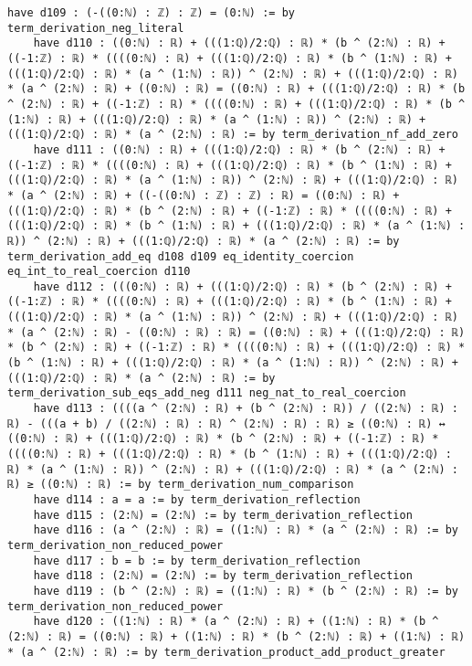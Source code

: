 \documentclass{article}
\begin{document}
\begin{tcolorbox}[colback=white!10, width=\linewidth]
\begin{lstlisting}[language=Lean4]
    have d109 : (-((0:ℕ) : ℤ) : ℤ) = (0:ℕ) := by term_derivation_neg_literal
    have d110 : ((0:ℕ) : ℝ) + (((1:ℚ)/2:ℚ) : ℝ) * (b ^ (2:ℕ) : ℝ) + ((-1:ℤ) : ℝ) * ((((0:ℕ) : ℝ) + (((1:ℚ)/2:ℚ) : ℝ) * (b ^ (1:ℕ) : ℝ) + (((1:ℚ)/2:ℚ) : ℝ) * (a ^ (1:ℕ) : ℝ)) ^ (2:ℕ) : ℝ) + (((1:ℚ)/2:ℚ) : ℝ) * (a ^ (2:ℕ) : ℝ) + ((0:ℕ) : ℝ) = ((0:ℕ) : ℝ) + (((1:ℚ)/2:ℚ) : ℝ) * (b ^ (2:ℕ) : ℝ) + ((-1:ℤ) : ℝ) * ((((0:ℕ) : ℝ) + (((1:ℚ)/2:ℚ) : ℝ) * (b ^ (1:ℕ) : ℝ) + (((1:ℚ)/2:ℚ) : ℝ) * (a ^ (1:ℕ) : ℝ)) ^ (2:ℕ) : ℝ) + (((1:ℚ)/2:ℚ) : ℝ) * (a ^ (2:ℕ) : ℝ) := by term_derivation_nf_add_zero
    have d111 : ((0:ℕ) : ℝ) + (((1:ℚ)/2:ℚ) : ℝ) * (b ^ (2:ℕ) : ℝ) + ((-1:ℤ) : ℝ) * ((((0:ℕ) : ℝ) + (((1:ℚ)/2:ℚ) : ℝ) * (b ^ (1:ℕ) : ℝ) + (((1:ℚ)/2:ℚ) : ℝ) * (a ^ (1:ℕ) : ℝ)) ^ (2:ℕ) : ℝ) + (((1:ℚ)/2:ℚ) : ℝ) * (a ^ (2:ℕ) : ℝ) + ((-((0:ℕ) : ℤ) : ℤ) : ℝ) = ((0:ℕ) : ℝ) + (((1:ℚ)/2:ℚ) : ℝ) * (b ^ (2:ℕ) : ℝ) + ((-1:ℤ) : ℝ) * ((((0:ℕ) : ℝ) + (((1:ℚ)/2:ℚ) : ℝ) * (b ^ (1:ℕ) : ℝ) + (((1:ℚ)/2:ℚ) : ℝ) * (a ^ (1:ℕ) : ℝ)) ^ (2:ℕ) : ℝ) + (((1:ℚ)/2:ℚ) : ℝ) * (a ^ (2:ℕ) : ℝ) := by term_derivation_add_eq d108 d109 eq_identity_coercion eq_int_to_real_coercion d110
    have d112 : (((0:ℕ) : ℝ) + (((1:ℚ)/2:ℚ) : ℝ) * (b ^ (2:ℕ) : ℝ) + ((-1:ℤ) : ℝ) * ((((0:ℕ) : ℝ) + (((1:ℚ)/2:ℚ) : ℝ) * (b ^ (1:ℕ) : ℝ) + (((1:ℚ)/2:ℚ) : ℝ) * (a ^ (1:ℕ) : ℝ)) ^ (2:ℕ) : ℝ) + (((1:ℚ)/2:ℚ) : ℝ) * (a ^ (2:ℕ) : ℝ) - ((0:ℕ) : ℝ) : ℝ) = ((0:ℕ) : ℝ) + (((1:ℚ)/2:ℚ) : ℝ) * (b ^ (2:ℕ) : ℝ) + ((-1:ℤ) : ℝ) * ((((0:ℕ) : ℝ) + (((1:ℚ)/2:ℚ) : ℝ) * (b ^ (1:ℕ) : ℝ) + (((1:ℚ)/2:ℚ) : ℝ) * (a ^ (1:ℕ) : ℝ)) ^ (2:ℕ) : ℝ) + (((1:ℚ)/2:ℚ) : ℝ) * (a ^ (2:ℕ) : ℝ) := by term_derivation_sub_eqs_add_neg d111 neg_nat_to_real_coercion
    have d113 : ((((a ^ (2:ℕ) : ℝ) + (b ^ (2:ℕ) : ℝ)) / ((2:ℕ) : ℝ) : ℝ) - (((a + b) / ((2:ℕ) : ℝ) : ℝ) ^ (2:ℕ) : ℝ) : ℝ) ≥ ((0:ℕ) : ℝ) ↔ ((0:ℕ) : ℝ) + (((1:ℚ)/2:ℚ) : ℝ) * (b ^ (2:ℕ) : ℝ) + ((-1:ℤ) : ℝ) * ((((0:ℕ) : ℝ) + (((1:ℚ)/2:ℚ) : ℝ) * (b ^ (1:ℕ) : ℝ) + (((1:ℚ)/2:ℚ) : ℝ) * (a ^ (1:ℕ) : ℝ)) ^ (2:ℕ) : ℝ) + (((1:ℚ)/2:ℚ) : ℝ) * (a ^ (2:ℕ) : ℝ) ≥ ((0:ℕ) : ℝ) := by term_derivation_num_comparison
    have d114 : a = a := by term_derivation_reflection
    have d115 : (2:ℕ) = (2:ℕ) := by term_derivation_reflection
    have d116 : (a ^ (2:ℕ) : ℝ) = ((1:ℕ) : ℝ) * (a ^ (2:ℕ) : ℝ) := by term_derivation_non_reduced_power
    have d117 : b = b := by term_derivation_reflection
    have d118 : (2:ℕ) = (2:ℕ) := by term_derivation_reflection
    have d119 : (b ^ (2:ℕ) : ℝ) = ((1:ℕ) : ℝ) * (b ^ (2:ℕ) : ℝ) := by term_derivation_non_reduced_power
    have d120 : ((1:ℕ) : ℝ) * (a ^ (2:ℕ) : ℝ) + ((1:ℕ) : ℝ) * (b ^ (2:ℕ) : ℝ) = ((0:ℕ) : ℝ) + ((1:ℕ) : ℝ) * (b ^ (2:ℕ) : ℝ) + ((1:ℕ) : ℝ) * (a ^ (2:ℕ) : ℝ) := by term_derivation_product_add_product_greater

\end{lstlisting}
\end{tcolorbox}
\end{document}
